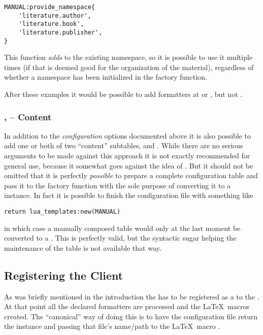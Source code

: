 \documentclass[12pt]{scrartcl}
\begin{document}
\begin{verbatim}
MANUAL:provide_namespace{
	'literature.author',
	'literature.book',
	'literature.publisher',
}
\end{verbatim}

\noindent This function \emph{adds} to the existing namespace, so it is possible
to use it multiple times (if that is deemed good for the organization of the
material), regardless of whether a namespace has been initialized in the factory
function.

After these examples it would be possible to add formatters at
 or , but not
.

\subsubsection[Content]{,  -- Content}

In addition to the \emph{configuration} options documented above it is also
possible to add one or both of two “content” subtables,  and
.  While there are no serious arguments to be made against
this approach it is not exactly recommended for general use, because it somewhat
goes against the idea of \luatemplates. But it should not be omitted
that it is perfectly \emph{possible} to prepare a complete configuration table
and pass it to the factory function with the sole purpose of converting it to a
 instance. In fact it is possible to finish the
configuration file with something like

\begin{verbatim}
return lua_templates:new(MANUAL)
\end{verbatim}

\noindent in which case a manually composed table  would only at
the last moment be converted to a .  This is perfectly
valid, but the syntactic sugar helping the maintenance of the table is not
available that way.


\subsection{Registering the Client}
\label{sec:usage-registering-the-client}

As was briefly mentioned in the introduction the  has to be registered as a  to the .  At that point all the declared formatters are processed and the \LaTeX\ macros created.  The “canonical” way of doing this is to have the configuration file return the  instance and passing that file's name/path  to the \LaTeX\ macro \texttt{}.
\end{document}
